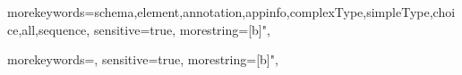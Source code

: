 			{morekeywords={schema,element,annotation,appinfo,complexType,simpleType,choice,all,sequence},		
			sensitive=true,
			morestring=[b]",
		}
		
			{morekeywords={},		
			sensitive=true,
			morestring=[b]",
		}
		
	

	
		
			
	
		\setlength{\parskip}{1.5ex plus 0.0ex minus 0.0ex}
		\setlength{\parindent}{0pt}
	
		\renewcommand{\floatpagefraction}{0.9}
		\renewcommand{\topfraction}{0.9}
		\renewcommand{\bottomfraction}{0.9}
		\renewcommand{\textfraction}{0.1}
		\renewcommand{\textfloatsep}{5mm}
	
		\renewcommand{\baselinestretch}{1.25}

		\fancyhf{} %
		\fancyhead[EL]{\nouppercase{\leftmark}}
		\fancyhead[OR]{\nouppercase{\rightmark}}
		\fancyfoot[EL,OR]{\thepage}	
		
